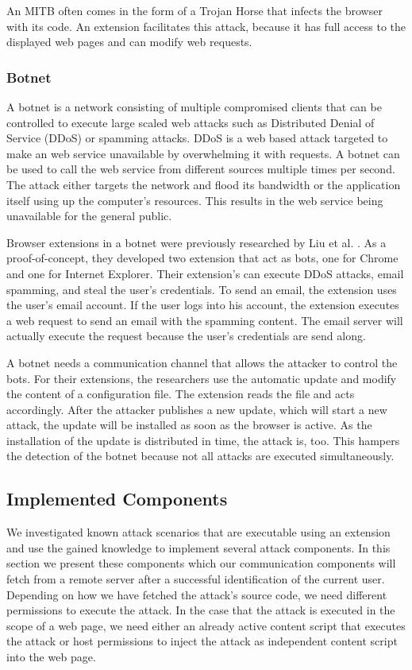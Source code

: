 	An MITB often comes in the form of a Trojan Horse that infects the browser with its code. An extension facilitates this attack, because it has full access to the displayed web pages and can modify web requests. 
	
\subsubsection{Botnet}

	A botnet is a network consisting of multiple compromised clients that can be controlled to execute large scaled web attacks such as Distributed Denial of Service (DDoS) or spamming attacks. DDoS is a web based attack targeted to make an web service unavailable by overwhelming it with requests. A botnet can be used to call the web service from different sources multiple times per second. The attack either targets the network and flood its bandwidth or the application itself using up the computer's resources. This results in the web service being unavailable for the general public. \cite{liu2011botnet}
	
	Browser extensions in a botnet were previously researched by Liu et al. \cite{liu2011botnet}. As a proof-of-concept, they developed two extension that act as bots, one for Chrome and one for Internet Explorer. Their extension's can execute DDoS attacks, email spamming, and steal the user's credentials. To send an email, the extension uses the user's email account. If the user logs into his account, the extension executes a web request to send an email with the spamming content. The email server will actually execute the request because the user's credentials are send along. 
	
	A botnet needs a communication channel that allows the attacker to control the bots. For their extensions, the researchers use the automatic update and modify the content of a configuration file. The extension reads the file and acts accordingly. After the attacker publishes a new update, which will start a new attack, the update will be installed as soon as the browser is active. As the installation of the update is distributed in time, the attack is, too. This hampers the detection of the botnet because not all attacks are executed simultaneously.
	
\subsection{Implemented Components}
	
	We investigated known attack scenarios that are executable using an extension and use the gained knowledge to implement several attack components. In this section we present these components which our communication components will fetch from a remote server after a successful identification of the current user. Depending on how we have fetched the attack's source code, we need different permissions to execute the attack. In the case that the attack is executed in the scope of a web page, we need either an already active content script that executes the attack or host permissions to inject the attack as independent content script into the web page.

